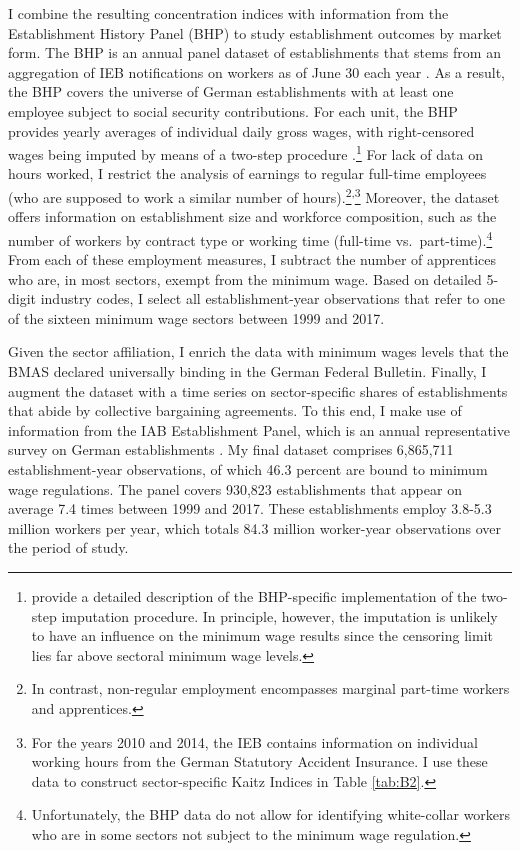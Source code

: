\documentclass[11pt,oneside,reqno,xcolor=dvipsnames]{article} %
\newcommand\fnsep{\textsuperscript{,}} %
\begin{document}
I combine the resulting concentration indices with information from the Establishment History Panel (BHP) to study establishment outcomes by market form. The BHP is an annual panel dataset of establishments that stems from an aggregation of IEB notifications on workers as of June 30 each year \citep{GanzerEtAl2020}. As a result, the BHP covers the universe of German establishments with at least one employee subject to social security contributions. For each unit, the BHP provides yearly averages of individual daily gross wages, with right-censored wages being imputed by means of a two-step procedure \citep{CardEtAl2013}.\footnote{\citet{GanzerEtAl2020} provide a detailed description of the BHP-specific implementation of the two-step imputation procedure. In principle, however, the imputation is unlikely to have an influence on the minimum wage results since the censoring limit lies far above sectoral minimum wage levels.} For lack of data on hours worked, I restrict the analysis of earnings to regular full-time employees (who are supposed to work a similar number of hours).\footnote{In contrast, non-regular employment encompasses marginal part-time workers and apprentices.}\fnsep\footnote{For the years 2010 and 2014, the IEB contains information on individual working hours from the German Statutory Accident Insurance. I use these data to construct sector-specific Kaitz Indices in Table \ref{tab:B2}.} Moreover, the dataset offers information on establishment size and workforce composition, such as the number of workers by contract type or working time (full-time vs.\ part-time).\footnote{Unfortunately, the BHP data do not allow for identifying white-collar workers who are in some sectors not subject to the minimum wage regulation.} From each of these employment measures, I subtract the number of apprentices who are, in most sectors, exempt from the minimum wage. Based on detailed 5-digit industry codes, I select all establishment-year observations that refer to one of the sixteen minimum wage sectors between 1999 and 2017.

Given the sector affiliation, I enrich the data with minimum wages levels that the BMAS declared universally binding in the German Federal Bulletin. Finally, I augment the dataset with a time series on sector-specific shares of establishments that abide by collective bargaining agreements. To this end, I make use of information from the IAB Establishment Panel, which is an annual representative survey on German establishments \citep{EllguthEtAl2014}. My final dataset comprises 6,865,711 establishment-year observations, of which 46.3 percent are bound to minimum wage regulations. The panel covers 930,823 establishments that appear on average 7.4 times between 1999 and 2017. These establishments employ 3.8-5.3 million workers per year, which totals 84.3 million worker-year observations over the period of study.
\end{document}
